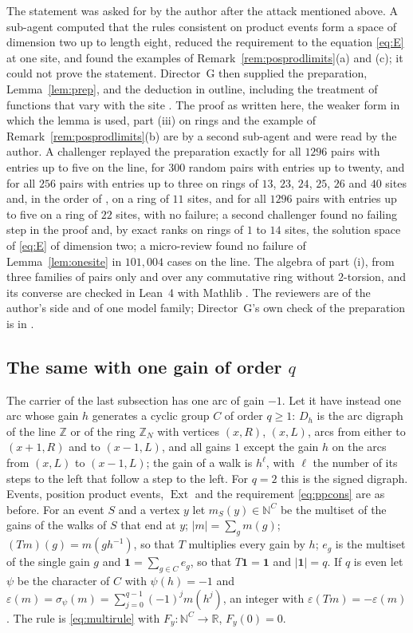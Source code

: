 The statement was asked for by the author after the attack mentioned above. A sub-agent computed that the rules consistent on product events form a space of dimension two up to length eight, reduced the requirement to the equation \eqref{eq:E} at one site, and found the examples of Remark~\ref{rem:posprodlimits}(a) and (c); it could not prove the statement. Director~G then supplied the preparation, Lemma~\ref{lem:prep}, and the deduction in outline, including the treatment of functions that vary with the site \cite{dgmask}. The proof as written here, the weaker form in which the lemma is used, part (iii) on rings and the example of Remark~\ref{rem:posprodlimits}(b) are by a second sub-agent and were read by the author. A challenger replayed the preparation exactly for all $1296$ pairs with entries up to five on the line, for $300$ random pairs with entries up to twenty, and for all $256$ pairs with entries up to three on rings of $13$, $23$, $24$, $25$, $26$ and $40$ sites and, in the order of \cite{dgmask}, on a ring of $11$ sites, and for all $1296$ pairs with entries up to five on a ring of $22$ sites, with no failure; a second challenger found no failing step in the proof and, by exact ranks on rings of $1$ to $14$ sites, the solution space of \eqref{eq:E} of dimension two; a micro-review found no failure of Lemma~\ref{lem:onesite} in $101{,}004$ cases on the line. The algebra of part (i), from three families of pairs only and over any commutative ring without $2$-torsion, and its converse are checked in Lean~4 with Mathlib \cite{comp4s}. The reviewers are of the author's side and of one model family; Director~G's own check of the preparation is in \cite{dgmask}.

\subsection{The same with one gain of order $q$}

The carrier of the last subsection has one arc of gain $-1$. Let it have instead one arc whose gain $h$ generates a cyclic group $C$ of order $q\ge1$: $D_h$ is the arc digraph of the line $\mathbb{Z}$ or of the ring $\mathbb{Z}_N$ with vertices $(x,R)$, $(x,L)$, arcs from either to $(x+1,R)$ and to $(x-1,L)$, and all gains $1$ except the gain $h$ on the arcs from $(x,L)$ to $(x-1,L)$; the gain of a walk is $h^\ell$, with $\ell$ the number of its steps to the left that follow a step to the left. For $q=2$ this is the signed digraph. Events, position product events, $\operatorname{Ext}$ and the requirement \eqref{eq:ppcons} are as before. For an event $S$ and a vertex $y$ let $m_S(y)\in\mathbb{N}^C$ be the multiset of the gains of the walks of $S$ that end at $y$; $|m|=\sum_gm(g)$; $(Tm)(g)=m(gh^{-1})$, so that $T$ multiplies every gain by $h$; $e_g$ is the multiset of the single gain $g$ and $\mathbf{1}=\sum_{g\in C}e_g$, so that $T\mathbf{1}=\mathbf{1}$ and $|\mathbf{1}|=q$. If $q$ is even let $\psi$ be the character of $C$ with $\psi(h)=-1$ and $\varepsilon(m)=\sigma_\psi(m)=\sum_{j=0}^{q-1}(-1)^jm(h^j)$, an integer with $\varepsilon(Tm)=-\varepsilon(m)$. The rule is \eqref{eq:multirule} with $F_y\colon\mathbb{N}^C\to\mathbb{R}$, $F_y(0)=0$.

